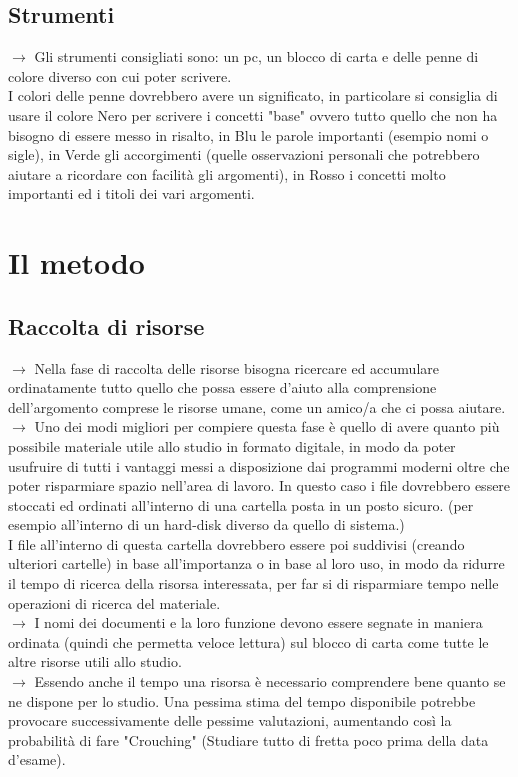 \documentclass[11pt,a4paper]{article}
\begin{document}
\subsection{Strumenti}
$\rightarrow$ Gli strumenti consigliati sono: un pc, un blocco di carta e delle penne di colore diverso con cui poter scrivere.\\
 I colori delle penne dovrebbero avere un significato, in particolare si consiglia di usare il colore Nero per scrivere i concetti "base" ovvero tutto quello che non ha bisogno di essere messo in risalto, in Blu le parole importanti (esempio nomi o sigle), in Verde gli accorgimenti (quelle osservazioni personali che potrebbero aiutare a ricordare con facilità gli argomenti), in Rosso i concetti molto importanti ed i titoli dei vari argomenti.\\
\newline

\section{Il metodo}
\subsection{Raccolta di risorse}
$\rightarrow$ Nella fase di raccolta delle risorse bisogna ricercare ed accumulare ordinatamente tutto quello che possa essere d'aiuto alla comprensione dell'argomento comprese le risorse umane, come un amico/a che ci possa aiutare.\\
$\rightarrow$ Uno dei modi migliori per compiere questa fase è quello di avere quanto più possibile materiale utile allo studio in formato digitale, in modo da poter usufruire di tutti i vantaggi messi a disposizione dai programmi moderni oltre che poter risparmiare spazio nell'area di lavoro. In questo caso i file dovrebbero essere stoccati ed ordinati all'interno di una cartella posta in un posto sicuro. (per esempio  all'interno di un hard-disk diverso da quello di sistema.)\\
I file all'interno di questa cartella dovrebbero essere poi suddivisi (creando ulteriori cartelle) in base all'importanza o in base al loro uso, in modo da ridurre il tempo di ricerca della risorsa interessata, per far si di risparmiare tempo nelle operazioni di ricerca del materiale.\\ 
$\rightarrow$ I nomi dei documenti e la loro funzione devono essere segnate in maniera ordinata (quindi che permetta veloce lettura) sul blocco di carta come tutte le altre risorse utili allo studio.\\
$\rightarrow$ Essendo anche il tempo una risorsa è necessario comprendere bene quanto se ne dispone per lo studio. Una pessima stima del tempo disponibile potrebbe provocare successivamente delle pessime valutazioni, aumentando così la probabilità di fare "Crouching" (Studiare tutto di fretta poco prima della data d'esame).\\
\end{document}
